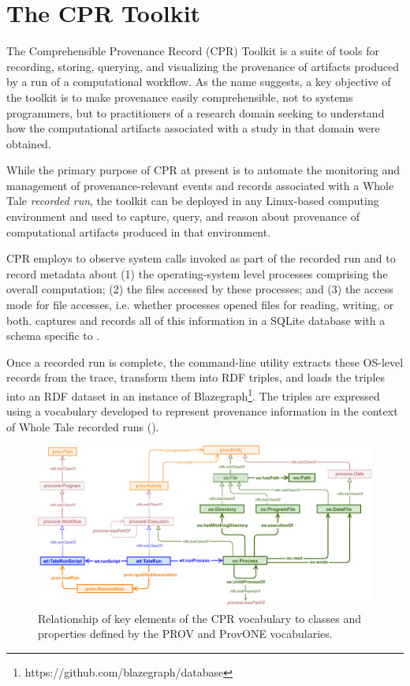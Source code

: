 \section{The CPR Toolkit}

The Comprehensible Provenance Record (CPR) Toolkit is a suite of tools for recording, storing, querying, and visualizing the provenance of artifacts produced by a run of a computational workflow. As the name suggests, a key objective of the toolkit is to make provenance easily comprehensible, not to systems programmers, but to practitioners of a research domain seeking to understand how the computational artifacts associated with a study in that domain were obtained.

While the primary purpose of CPR at present is to automate the monitoring and management of provenance-relevant events and records associated with a Whole Tale \emph{recorded run}, the toolkit can be deployed in any Linux-based computing environment and used to capture, query, and reason about provenance of computational artifacts produced in that environment.

CPR employs  \cite{rampin_reprozip_2016} to observe system calls invoked as part of the recorded run and to record metadata about (1) the operating-system level processes comprising the overall computation; (2) the files accessed by these processes; and (3) the access mode for file accesses, i.e. whether processes opened files for reading, writing, or both.  captures and records all of this information in a SQLite database with a schema specific to .

Once a recorded run is complete, the  command-line utility extracts these OS-level records from the  trace, transform them into RDF triples, and loads the triples into an RDF dataset in an instance of Blazegraph\footnote{https://github.com/blazegraph/database}. The triples are expressed using a vocabulary developed to represent provenance information in the context of Whole Tale recorded runs (). 

\vspace*{-1.5em}
\begin{figure}[h]
    \centering
    \includegraphics[width=0.95\linewidth]{figures/cpr-vocab.pdf}
    \caption{Relationship of key elements of the CPR vocabulary to classes and properties defined by the PROV and ProvONE vocabularies.}
    \label{fig:cpr-vocab}
\end{figure}
\vspace*{-1.5em}

